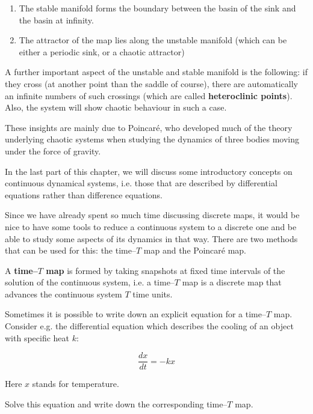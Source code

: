 \begin{enumerate}
\item
The stable manifold forms the boundary between the basin of the sink and the basin at infinity.
\item
The attractor of the map lies along the unstable manifold (which can be either a periodic sink, or a chaotic attractor)
\end{enumerate}

A further important aspect of the unstable and stable manifold is the following: if they cross (at another point than the saddle of course), there are automatically an infinite numbers of such crossings (which are called \textbf{heteroclinic points}). Also, the system will show chaotic behaviour in such a case.

These insights are mainly due to Poincar\'{e}, who developed much of the theory underlying chaotic systems when studying the dynamics of three bodies moving under the force of gravity.

\pagebreak


In the last part of this chapter, we will discuss some introductory concepts on continuous dynamical systems, i.e. those that are described by differential equations rather than difference equations.

Since we have already spent so much time discussing discrete maps, it would be nice to have some tools to reduce a continuous system to a discrete one and be able to study some aspects of its dynamics in that way. There are two methods that can be used for this: the time--$T$ map and the Poincar\'{e} map.

A \textbf{time--$T$ map} is formed by taking snapshots at fixed time intervals of the solution of the continuous system, i.e. a time--$T$ map is a discrete map that advances the continuous system $T$ time units. 

Sometimes it is possible to write down an explicit equation for a time--$T$ map. Consider e.g. the differential equation which describes the cooling of an object with specific heat $k$:

\begin{equation}
\frac{dx}{dt} = -k x
\end{equation} 

Here $x$ stands for temperature.

\begin{cue}
Solve this equation and write down the corresponding time--$T$ map.  
\end{cue}


